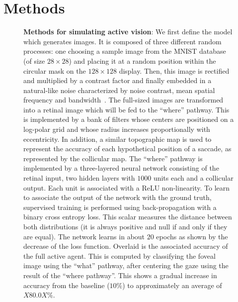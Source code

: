 \section{Methods}
\label{sec:methods}
\begin{figure}[t!]%
\caption{
{\bf Methods for simulating active vision}:
\A We first define the model which generates images. It is composed of three different random processes: one choosing a sample image from the MNIST database (of size $28\times 28$) and placing it at a random position within the circular mask on the $128\times 128$ display. Then, this image is rectified and multiplied by a contrast factor and finally embedded in a natural-like noise characterized by noise contrast, mean spatial frequency and bandwidth~\citep{Sanz12}. %
\B The full-sized images are transformed into a retinal image which will be fed to the ``where'' pathway. This is implemented by a bank of filters whose centers are positioned on a log-polar grid and whose radius increases proportionally with eccentricity. In addition, a similar topographic map is used to represent the accuracy of each hypothetical position of a saccade, as represented by the collicular map. %
\C The ``where'' pathway is implemented by a three-layered neural network consisting of the retinal input, two hidden layers with $1000$ units each and a collicular output. Each unit is associated with a ReLU non-linearity. To learn to associate the output of the network with the ground truth, supervised training is performed using back-propagation with a binary cross entropy loss. This scalar measures the distance between both distributions (it is always positive and null if and only if they are equal). The network learns in about $20$ epochs as shown by the decrease of the loss function. Overlaid is the associated accuracy of the full active agent. This is computed by classifying the foveal image using the ``what'' pathway, after centering the gaze using the result of the ``where pathway''. This shows a gradual increase in accuracy from the baseline ($10\%$) to approximately an average of $X80.0X\%$. %
		\label{fig:methods}}%
\end{figure}%
